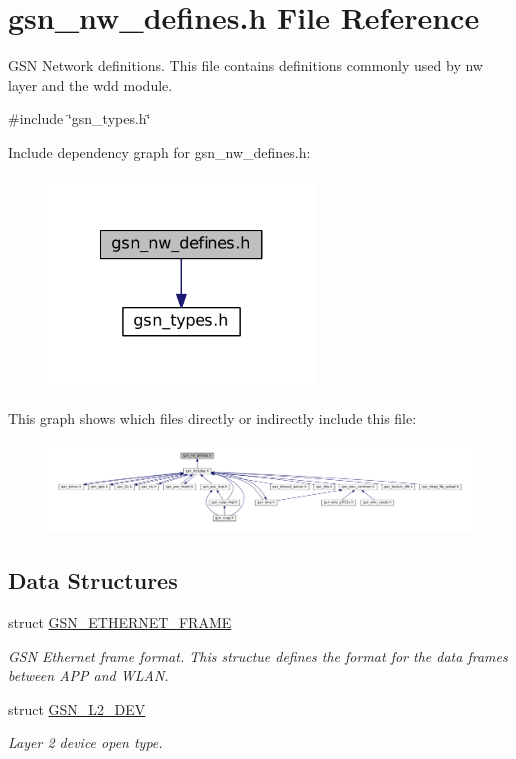 \hypertarget{a00533}{
\section{gsn\_\-nw\_\-defines.h File Reference}
\label{a00533}
}


GSN Network definitions. This file contains definitions commonly used by nw layer and the wdd module.  


{\ttfamily \#include \char`\"{}gsn\_\-types.h\char`\"{}}\par
Include dependency graph for gsn\_\-nw\_\-defines.h:
\nopagebreak
\begin{figure}[H]
\begin{center}
\leavevmode
\includegraphics[width=200pt]{a00767}
\end{center}
\end{figure}
This graph shows which files directly or indirectly include this file:
\nopagebreak
\begin{figure}[H]
\begin{center}
\leavevmode
\includegraphics[width=400pt]{a00768}
\end{center}
\end{figure}
\subsection*{Data Structures}
\begin{DoxyCompactItemize}
\item 
struct \hyperlink{a00068}{GSN\_\-ETHERNET\_\-FRAME}
\begin{DoxyCompactList}\small\item\em GSN Ethernet frame format. This structue defines the format for the data frames between APP and WLAN. \end{DoxyCompactList}\item 
struct \hyperlink{a00107}{GSN\_\-L2\_\-DEV}
\begin{DoxyCompactList}\small\item\em Layer 2 device open type. \end{DoxyCompactList}\end{DoxyCompactItemize}

